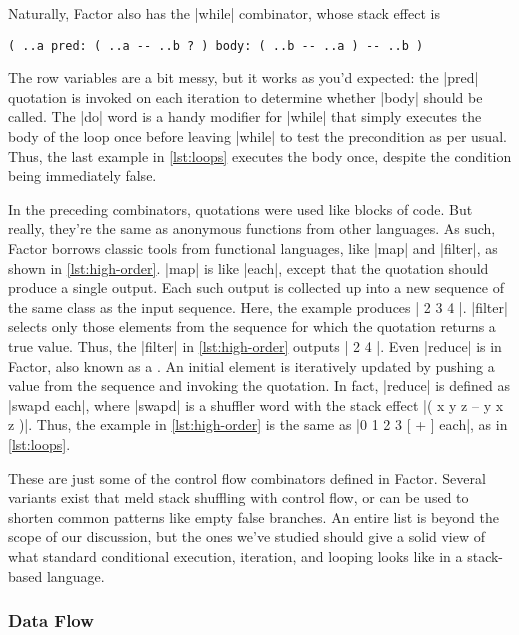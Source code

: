 Naturally, Factor also has the \factor|while| combinator, whose stack effect is
%
\begin{center}
%
  \Verb|( ..a pred: ( ..a -- ..b ? ) body: ( ..b -- ..a ) -- ..b )|
%
\end{center}
%
\noindent The row variables are a bit messy, but it works as you'd expected:
the \factor|pred| quotation is invoked on each iteration to determine whether
\factor|body| should be called.  The \factor|do| word is a handy modifier for
\factor|while| that simply executes the body of the loop once before leaving
\factor|while| to test the precondition as per usual.  Thus, the last example
in \vref{lst:loops} executes the body once, despite the condition being
immediately false.


In the preceding combinators, quotations were used like blocks of code.  But
really, they're the same as anonymous functions from other languages.  As such,
Factor borrows classic tools from functional languages, like \factor|map| and
\factor|filter|, as shown in \vref{lst:high-order}.  \factor|map| is like
\factor|each|, except that the quotation should produce a single output.  Each
such output is collected up into a new sequence of the same class as the input
sequence.  Here, the example produces
%
\factor|{ 2 3 4 }|.
%
\factor|filter| selects only those elements from the sequence for which the
quotation returns a true value.  Thus, the \factor|filter| in
\vref{lst:high-order} outputs
%
\factor|{ 2 4 }|.
%
Even \factor|reduce| is in Factor, also known as a .  An
initial element is iteratively updated by pushing a value from the sequence and
invoking the quotation.  In fact, \factor|reduce| is defined as
%
\factor|swapd each|,
%
where \factor|swapd| is a shuffler word with the stack effect
%
\factor|( x y z -- y x z )|.
%
Thus, the example in \vref{lst:high-order} is the same as
%
\factor|0 { 1 2 3 } [ + ] each|,
%
as in \vref{lst:loops}.

These are just some of the control flow combinators defined in Factor.  Several
variants exist that meld stack shuffling with control flow, or can be used to
shorten common patterns like empty false branches.  An entire list is beyond
the scope of our discussion, but the ones we've studied should give a solid
view of what standard conditional execution, iteration, and looping looks like
in a stack-based language.

\subsubsection{Data Flow}\label{sec:primer:data-flow}

